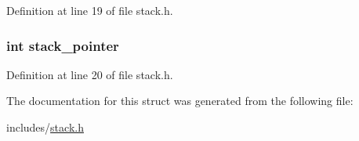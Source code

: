 Definition at line 19 of file stack.\+h.

\hypertarget{struct_stack_aeaf89f98603ac91bfe0c34b6e11e8fc5}{
\subsubsection[{stack\+\_\+pointer}]{\setlength{\rightskip}{0pt plus 5cm}int stack\+\_\+pointer}}\label{struct_stack_aeaf89f98603ac91bfe0c34b6e11e8fc5}


Definition at line 20 of file stack.\+h.



The documentation for this struct was generated from the following file\+:\begin{DoxyCompactItemize}
\item 
includes/\hyperlink{stack_8h}{stack.\+h}\end{DoxyCompactItemize}
